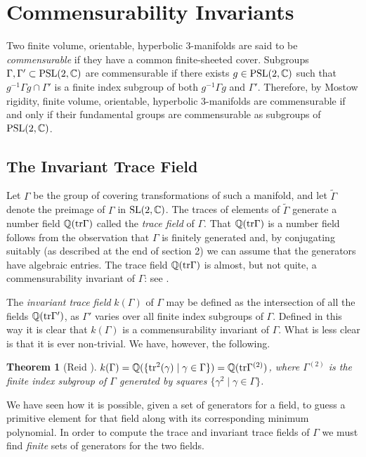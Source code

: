 \documentclass[a4paper]{amsart}
\def\Q{{\mathbb Q}}
\def\C{{\mathbb C}}
\def\psl2c{\mbox{\rm PSL}(2,\C)}
\def\sl2c{\mbox{\rm SL}(2,\C)}
\def\tr{\mbox{\rm tr}}
\def\Gammatil{\tilde{\Gamma}}
\newtheorem{theorem}{Theorem}[section]
\theoremstyle{definition}
\begin{document}
\section{Commensurability Invariants}

Two finite volume, orientable, hyperbolic 3-manifolds are said to be {\em
commensurable} if they have a common finite-sheeted cover. Subgroups
$\Gamma,\Gamma' \subset \psl2c$ are commensurable if there exists
$g\in \psl2c$ such that $g^{-1}\Gamma g \cap \Gamma'$ is a finite
index subgroup of both $g^{-1}\Gamma g$ and $\Gamma'$. Therefore, by
Mostow rigidity, finite
volume, orientable, hyperbolic 3-manifolds are commensurable if and only
if their fundamental groups are commensurable as subgroups of $\psl2c$. 

\subsection{The Invariant Trace Field}

Let $\Gamma$ be the group of covering transformations of such a
manifold, and let $\Gammatil$ denote the preimage of $\Gamma$ in $\sl2c$.
The traces of elements of $\Gammatil$
generate a number field $\Q(\tr\Gamma)$ called the {\em trace field} of
$\Gamma$. That $\Q(\tr\Gamma)$ is a number field follows from the
observation that $\Gamma$ is finitely generated and, by conjugating
suitably (as described at the end of section 2)
 we can assume that the generators have algebraic entries. 
The trace field $\Q(\tr\Gamma)$ is almost, but not quite, a
commensurability invariant of $\Gamma$: see \cite{reid}.

The {\em invariant trace field} $k(\Gamma)$ of $\Gamma$ may be defined as
the intersection of all the fields $\Q(\tr\Gamma')$, as $\Gamma'$ varies
over all finite index subgroups of $\Gamma$. Defined in this way it is
clear that $k(\Gamma)$ is a commensurability invariant of $\Gamma$.
What is less clear is that it is ever non-trivial. We have, however, the
following. 

\begin{theorem}[Reid \cite{reid}]
$k(\Gamma) = \Q(\{\tr^2(\gamma) \mid \gamma\in\Gamma\}) =
\Q(\tr\Gamma^{(2)})$, where $\Gamma^{(2)}$ is the finite index subgroup of
$\Gamma$ generated by squares $\{\gamma^2\mid\gamma\in\Gamma\}$. 
\end{theorem}

We have seen how it is possible, given a set of generators for a field,
to guess a primitive element for that field along with its
corresponding minimum polynomial. In order to compute the trace and
invariant trace fields of $\Gamma$ we must find {\em finite} sets of
generators for the two fields. 
\end{document}
